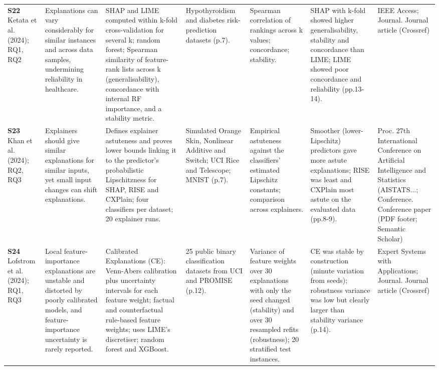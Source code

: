 \begin{longtable}{@{}P{1.55cm}P{2.9cm}P{4.5cm}P{3.2cm}P{3.4cm}P{4.6cm}P{3.6cm}@{}}
\textbf{S22} \cite{S22} Ketata et al. (2024); RQ1, RQ2 & Explanations can vary considerably for similar instances and across data samples, undermining reliability in healthcare. & SHAP and LIME computed within k-fold cross-validation for several k; random forest; Spearman similarity of feature-rank lists across k (generalisability), concordance with internal RF importance, and a stability metric. & Hypothyroidism and diabetes risk-prediction datasets (p.7). & Spearman correlation of rankings across k values; concordance; stability. & SHAP with k-fold showed higher generalisability, stability and concordance than LIME; LIME showed poor concordance and reliability (pp.13-14). & IEEE Access; Journal. Journal article (Crossref) \\
\textbf{S23} \cite{S23} Khan et al. (2024); RQ2, RQ3 & Explainers should give similar explanations for similar inputs, yet small input changes can shift explanations. & Defines explainer astuteness and proves lower bounds linking it to the predictor's probabilistic Lipschitzness for SHAP, RISE and CXPlain; four classifiers per dataset; 20 explainer runs. & Simulated Orange Skin, Nonlinear Additive and Switch; UCI Rice and Telescope; MNIST (p.7). & Empirical astuteness against the classifiers' estimated Lipschitz constants; comparison across explainers. & Smoother (lower-Lipschitz) predictors gave more astute explanations; RISE was least and CXPlain most astute on the evaluated data (pp.8-9). & Proc. 27th International Conference on Artificial Intelligence and Statistics (AISTATS...; Conference. Conference paper (PDF footer; Semantic Scholar) \\
\textbf{S24} \cite{S24} Lofstrom et al. (2024); RQ1, RQ3 & Local feature-importance explanations are unstable and distorted by poorly calibrated models, and feature-importance uncertainty is rarely reported. & Calibrated Explanations (CE): Venn-Abers calibration plus uncertainty intervals for each feature weight; factual and counterfactual rule-based feature weights; uses LIME's discretiser; random forest and XGBoost. & 25 public binary classification datasets from UCI and PROMISE (p.12). & Variance of feature weights over 30 explanations with only the seed changed (stability) and over 30 resampled refits (robustness); 20 stratified test instances. & CE was stable by construction (minute variation from seeds); robustness variance was low but clearly larger than stability variance (p.14). & Expert Systems with Applications; Journal. Journal article (Crossref) \\

\end{longtable}
